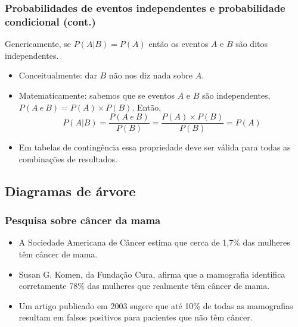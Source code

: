 \begin{frame}
\frametitle{Probabilidades de eventos independentes e probabilidade condicional (cont.)}
\justifying
Genericamente, se $P(A|B) = P(A)$ então os eventos $A$ e $B$ são ditos independentes.

\pause

\begin{itemize}
\justifying
\item Conceitualmente: dar $B$ não nos diz nada sobre $A$.

\pause
\justifying
\item Matematicamente: sabemos que se eventos $A$ e $B$ são independentes, $P(A~e~B) = P(A) \times P(B)$. Então,
\[ P(A|B) = \frac{P(A~e~B)}{P(B)} = \frac{P(A) \times P(B)}{P(B)} = P(A) \]


\justifying
\item Em tabelas de contingência essa propriedade deve ser válida para todas as combinações de resultados.


\end{itemize}

\end{frame}


\subsection{Diagramas de árvore}



\begin{frame}
\frametitle{Pesquisa sobre câncer da mama}

\begin{itemize}
\justifying
\item A Sociedade Americana de Câncer estima que cerca de 1,7\% das mulheres têm câncer de mama. \\
{\small{}}
\justifying
\item Susan G. Komen, da Fundação Cura, afirma que a mamografia identifica corretamente 78\% das mulheres que realmente têm câncer de mama. \\
{\small{}}
\justifying
\item Um artigo publicado em 2003 sugere que até 10\% de todas as mamografias resultam em falsos positivos para pacientes que não têm câncer. \\{\small {}}

\end{itemize}

\vfill
\justifying
{}

\end{frame}

